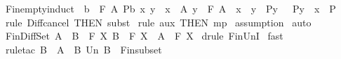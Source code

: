 \begin{isabellebody}
%
\endisadelimproof
\isanewline
{}\isamarkupfalse%
\ Fin{\isacharunderscore}empty{\isacharunderscore}induct{\isacharcolon}\ {\isachardoublequoteopen}{\isacharbrackleft}{\isacharbar}\ b\ {\isacharcolon}\ {\isacharpercent}F\ A{\isacharsemicolon}\ P{\isacharparenleft}b{\isacharparenright}{\isacharsemicolon}\ {\isacharbang}{\isacharbang}x\ y{\isachardot}\ {\isacharbrackleft}{\isacharbar}\ x\ {\isacharcolon}\ A{\isacharsemicolon}\ y\ {\isacharcolon}\ {\isacharpercent}F\ A{\isacharsemicolon}\ \ x\ {\isacharcolon}\ y{\isacharsemicolon}\ \ P{\isacharparenleft}y{\isacharparenright}\ {\isacharbar}{\isacharbrackright}\ {\isacharequal}{\isacharequal}{\isachargreater}\ P{\isacharparenleft}y\ {\isacharminus}\ {\isacharbraceleft}x{\isacharbraceright}{\isacharparenright}{\isacharbar}{\isacharbrackright}\ {\isacharequal}{\isacharequal}{\isachargreater}\ P{\isacharparenleft}{\isacharbraceleft}{\isacharbraceright}{\isacharparenright}{\isachardoublequoteclose}\isanewline
%
\isadelimproof
%
\endisadelimproof
%
\isatagproof
{}\isamarkupfalse%
\ {\isacharparenleft}rule\ Diff{\isacharunderscore}cancel\ {\isacharbrackleft}THEN\ subst{\isacharbrackright}{\isacharparenright}\isanewline
{}\isamarkupfalse%
\ {\isacharparenleft}rule\ aux\ {\isacharbrackleft}THEN\ mp{\isacharbrackright}{\isacharparenright}\isanewline
{}\isamarkupfalse%
\ assumption{\isacharplus}\isanewline
{}\isamarkupfalse%
\ auto\isanewline
{}\isamarkupfalse%
%
\endisatagproof
{\isafoldproof}%
%
\isadelimproof
%
\endisadelimproof
%
\isamarkuptrue%
\isamarkupfalse%
\ Fin{\isacharunderscore}Diff{\isacharunderscore}Set{\isacharcolon}\ {\isachardoublequoteopen}{\isacharbrackleft}{\isacharbar}{\isacharparenleft}A\ {\isacharminus}\ B{\isacharparenright}\ {\isacharcolon}\ {\isacharpercent}F\ X{\isacharsemicolon}\ B\ {\isacharcolon}\ {\isacharpercent}F\ X{\isacharbar}{\isacharbrackright}\ {\isacharequal}{\isacharequal}{\isachargreater}\ A\ {\isacharcolon}\ {\isacharpercent}F\ X{\isachardoublequoteclose}\isanewline
%
\isadelimproof
%
\endisadelimproof
%
\isatagproof
{}\isamarkupfalse%
\ {\isacharparenleft}drule\ Fin{\isacharunderscore}UnI{\isacharparenright}\isanewline
{}\isamarkupfalse%
\ fast\isanewline
{}\isamarkupfalse%
\ {\isacharparenleft}rule{\isacharunderscore}tac\ B\ {\isacharequal}\ {\isachardoublequoteopen}A\ {\isacharminus}\ B\ Un\ B{\isachardoublequoteclose}\ \ Fin{\isacharunderscore}subset{\isacharparenright}\isanewline

\end{isabellebody}
